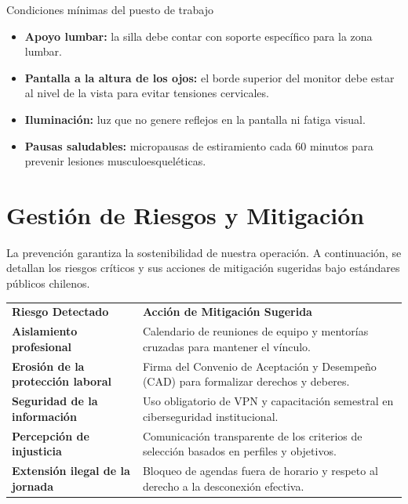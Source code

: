 \documentclass[11pt,letterpaper]{article}
\newcommand{\strong}[1]{\textbf{\textcolor{AzulProfundo}{#1}}}
\begin{document}
\begin{KeyBox}{Condiciones mínimas del puesto de trabajo}
\begin{itemize}
    \item \strong{Apoyo lumbar:} la silla debe contar con soporte específico para la zona lumbar.
    \item \strong{Pantalla a la altura de los ojos:} el borde superior del monitor debe estar al nivel de la vista para evitar tensiones cervicales.
    \item \strong{Iluminación:} luz que no genere reflejos en la pantalla ni fatiga visual.
    \item \strong{Pausas saludables:} micropausas de estiramiento cada 60 minutos para prevenir lesiones musculoesqueléticas.
\end{itemize}
\end{KeyBox}

\section{Gestión de Riesgos y Mitigación}

La prevención garantiza la sostenibilidad de nuestra operación. A continuación, se detallan los riesgos críticos y sus acciones de mitigación sugeridas bajo estándares públicos chilenos.

\begin{tabularx}{\textwidth}{L{0.34\textwidth} Y}
\color{BlancoIndustrial}\textbf{Riesgo Detectado} & \color{BlancoIndustrial}\textbf{Acción de Mitigación Sugerida} \\
\textbf{Aislamiento profesional} & Calendario de reuniones de equipo y mentorías cruzadas para mantener el vínculo. \\
\textbf{Erosión de la protección laboral} & Firma del Convenio de Aceptación y Desempeño (CAD) para formalizar derechos y deberes. \\
\textbf{Seguridad de la información} & Uso obligatorio de VPN y capacitación semestral en ciberseguridad institucional. \\
\textbf{Percepción de injusticia} & Comunicación transparente de los criterios de selección basados en perfiles y objetivos. \\
\textbf{Extensión ilegal de la jornada} & Bloqueo de agendas fuera de horario y respeto al derecho a la desconexión efectiva. \\
\end{tabularx}
\end{document}
